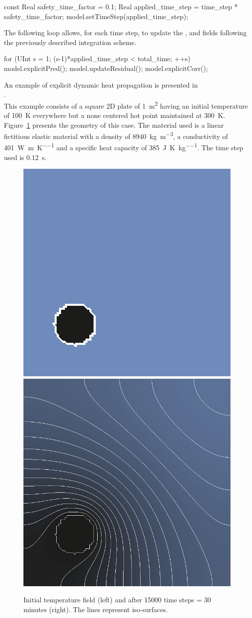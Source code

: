 \begin{cpp}
  const Real safety_time_factor = 0.1;
  Real applied_time_step = time_step * safety_time_factor;
  model.setTimeStep(applied_time_step);
\end{cpp}

The following loop  allows, for each time  step, to update the  ,  and
  fields  following the previously described integration scheme.

\begin{cpp}
  for (UInt s = 1; (s-1)*applied_time_step < total_time; ++s) {
    model.explicitPred();
    model.updateResidual();
    model.explicitCorr();
  }
\end{cpp}

An    example    of    explicit     dynamic    heat propagation is    presented    in \\
.  \\
This example consists of a square 2D plate of \SI{1}{\metre^2}
having an initial temperature of \SI{100}{\kelvin} everywhere but a
none centered hot point maintained at
\SI{300}{\kelvin}. Figure~\ref{fig:htm:explicit:dynamic} presents
the geometry of this case. The material used is a linear fictitious
elastic material with a density of
\SI{8940}{\kilo\gram\per\metre^3}, a conductivity of
\SI{401}{\watt\per\metre\per\kelvin} and a specific heat capacity of
\SI{385}{\joule\per\kelvin\per\kilogram}. The time step used is
\SI{0.12}{\second}.

\begin{figure}[!htb]
  \centering
  \includegraphics[width=.4\textwidth]{figures/hot-point-1}
  \hfill
  \includegraphics[width=.4\textwidth]{figures/hot-point-2}
  \caption{Initial temperature field (left) and after 15000 time steps = 30 minutes (right). The lines represent iso-surfaces.}
  \label{fig:htm:explicit:dynamic}
\end{figure}
